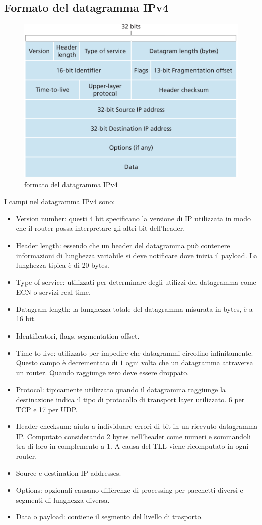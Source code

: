 \subsection{Formato del datagramma IPv4}
\begin{figure}[h]
\includegraphics[width=\textwidth]{IPv4Datagram.png}
\caption{formato del datagramma IPv4}
\end{figure}
I campi nel datagramma IPv4 sono:
\begin{itemize}
\item Version number: questi 4 bit specificano la versione di IP utilizzata in modo che il router possa interpretare gli altri bit dell'header.
\item Header length: essendo che un header del datagramma pu\`o contenere informazioni di lunghezza variabile si deve notificare dove inizia il payload.
La lunghezza tipica \`e di 20 bytes.
\item Type of service: utilizzati per determinare degli utilizzi del datagramma come ECN o servizi real-time.
\item Datagram length: la lunghezza totale del datagramma misurata in bytes, \`e a 16 bit.
\item Identificatori, flags, segmentation offset.
\item Time-to-live: utilizzato per impedire che datagrammi circolino infinitamente. Questo campo \`e decrementato di $1$ ogni volta che un datagramma 
attraversa un router. Quando raggiunge zero deve essere droppato.
\item Protocol: tipicamente utilizzato quando il datagramma raggiunge la destinazione indica il tipo di protocollo di transport layer utilizzato. 6 per TCP
e 17 per UDP.
\item Header checksum: aiuta a individuare errori di bit in un ricevuto datagramma IP. Computato considerando 2 bytes nell'header come numeri e sommandoli 
tra di loro in complemento a 1. A causa del TLL viene ricomputato in ogni router. 
\item Source e destination IP addresses.
\item Options: opzionali causano differenze di processing per pacchetti diversi e segmenti di lunghezza diversa.
\item Data o payload: contiene il segmento del livello di trasporto. 
\end{itemize}

